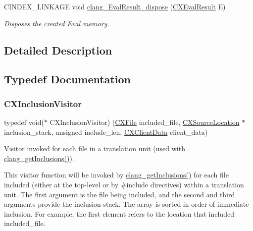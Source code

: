 \begin{DoxyCompactItemize}
\mbox{\label{group__CINDEX__MISC_gaee104dfbff3ee6799ddebb417e968d8a}} 
C\+I\+N\+D\+E\+X\+\_\+\+L\+I\+N\+K\+A\+GE void \hyperlink{group__CINDEX__MISC_gaee104dfbff3ee6799ddebb417e968d8a}{clang\+\_\+\+Eval\+Result\+\_\+dispose} (\hyperlink{group__CINDEX__MISC_gaa9270afc68877e1f3b20ce5b343191bc}{C\+X\+Eval\+Result} E)
\begin{DoxyCompactList}\small\item\em Disposes the created Eval memory. \end{DoxyCompactList}\end{DoxyCompactItemize}


\subsection{Detailed Description}


\subsection{Typedef Documentation}
\mbox{\label{group__CINDEX__MISC_ga075c50e5cf912f15d902cff864ea7d13}} 
\subsubsection{\texorpdfstring{C\+X\+Inclusion\+Visitor}{CXInclusionVisitor}}
{\footnotesize\ttfamily typedef void($\ast$ C\+X\+Inclusion\+Visitor) (\hyperlink{group__CINDEX__FILES_gacfcea9c1239c916597e2e5b3e109215a}{C\+X\+File} included\+\_\+file, \hyperlink{structCXSourceLocation}{C\+X\+Source\+Location} $\ast$inclusion\+\_\+stack, unsigned include\+\_\+len, \hyperlink{group__CINDEX_gacfa40c3de26d228c0d898403c2c21612}{C\+X\+Client\+Data} client\+\_\+data)}



Visitor invoked for each file in a translation unit (used with \hyperlink{group__CINDEX__MISC_ga4363bd8c203ca2b5dfc23c5765695d60}{clang\+\_\+get\+Inclusions()}). 

This visitor function will be invoked by \hyperlink{group__CINDEX__MISC_ga4363bd8c203ca2b5dfc23c5765695d60}{clang\+\_\+get\+Inclusions()} for each file included (either at the top-\/level or by \#include directives) within a translation unit. The first argument is the file being included, and the second and third arguments provide the inclusion stack. The array is sorted in order of immediate inclusion. For example, the first element refers to the location that included \textquotesingle{}included\+\_\+file\textquotesingle{}. 

